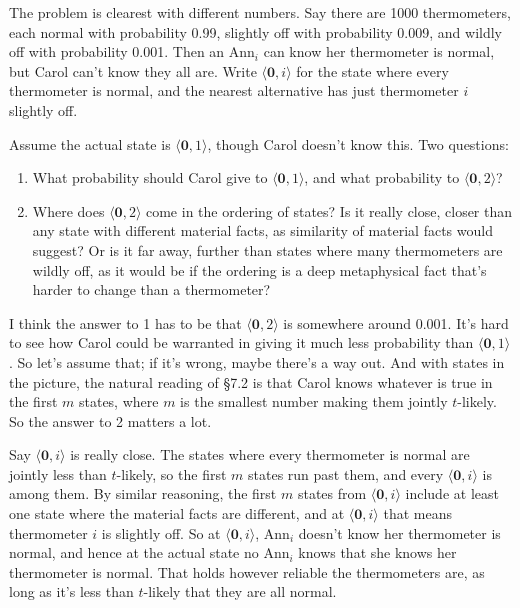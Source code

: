 \documentclass[
  11pt,
  letterpaper,
  DIV=11,
  numbers=noendperiod,
  twoside]{scrartcl}
\providecommand{\tightlist}{%
  \setlength{\itemsep}{0pt}\setlength{\parskip}{0pt}}
\begin{document}
The problem is clearest with different numbers. Say there are 1000
thermometers, each normal with probability 0.99, slightly off with
probability 0.009, and wildly off with probability 0.001. Then an
Ann\(_i\) can know her thermometer is normal, but Carol can't know they
all are. Write \(\langle \mathbf{0}, i\rangle\) for the state where
every thermometer is normal, and the nearest alternative has just
thermometer \(i\) slightly off.

Assume the actual state is \(\langle \mathbf{0}, 1\rangle\), though
Carol doesn't know this. Two questions:

\begin{enumerate}
\def\labelenumi{\arabic{enumi}.}
\tightlist
\item
  What probability should Carol give to
  \(\langle \mathbf{0}, 1\rangle\), and what probability to
  \(\langle \mathbf{0}, 2\rangle\)?
\item
  Where does \(\langle \mathbf{0}, 2\rangle\) come in the ordering of
  states? Is it really close, closer than any state with different
  material facts, as similarity of material facts would suggest? Or is
  it far away, further than states where many thermometers are wildly
  off, as it would be if the ordering is a deep metaphysical fact that's
  harder to change than a thermometer?
\end{enumerate}

I think the answer to 1 has to be that \(\langle \mathbf{0}, 2\rangle\)
is somewhere around 0.001. It's hard to see how Carol could be warranted
in giving it much less probability than
\(\langle \mathbf{0}, 1\rangle\). So let's assume that; if it's wrong,
maybe there's a way out. And with states in the picture, the natural
reading of §7.2 is that Carol knows whatever is true in the first \(m\)
states, where \(m\) is the smallest number making them jointly
\(t\)-likely. So the answer to 2 matters a lot.

Say \(\langle \mathbf{0}, i\rangle\) is really close. The states where
every thermometer is normal are jointly less than \(t\)-likely, so the
first \(m\) states run past them, and every
\(\langle \mathbf{0}, i\rangle\) is among them. By similar reasoning,
the first \(m\) states from \(\langle \mathbf{0}, i\rangle\) include at
least one state where the material facts are different, and at
\(\langle \mathbf{0}, i\rangle\) that means thermometer \(i\) is
slightly off. So at \(\langle \mathbf{0}, i\rangle\), Ann\(_i\) doesn't
know her thermometer is normal, and hence at the actual state no
Ann\(_i\) knows that she knows her thermometer is normal. That holds
however reliable the thermometers are, as long as it's less than
\(t\)-likely that they are all normal.
\end{document}
